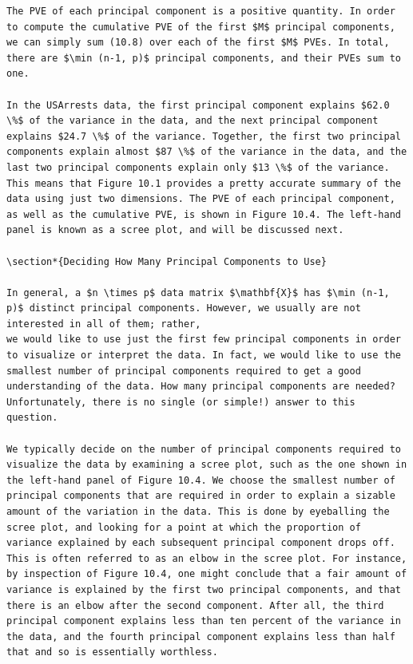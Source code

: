 \documentclass[10pt]{article}
\begin{document}
\begin{verbatim}
The PVE of each principal component is a positive quantity. In order to compute the cumulative PVE of the first $M$ principal components, we can simply sum (10.8) over each of the first $M$ PVEs. In total, there are $\min (n-1, p)$ principal components, and their PVEs sum to one.

In the USArrests data, the first principal component explains $62.0 \%$ of the variance in the data, and the next principal component explains $24.7 \%$ of the variance. Together, the first two principal components explain almost $87 \%$ of the variance in the data, and the last two principal components explain only $13 \%$ of the variance. This means that Figure 10.1 provides a pretty accurate summary of the data using just two dimensions. The PVE of each principal component, as well as the cumulative PVE, is shown in Figure 10.4. The left-hand panel is known as a scree plot, and will be discussed next.

\section*{Deciding How Many Principal Components to Use}

In general, a $n \times p$ data matrix $\mathbf{X}$ has $\min (n-1, p)$ distinct principal components. However, we usually are not interested in all of them; rather,
we would like to use just the first few principal components in order to visualize or interpret the data. In fact, we would like to use the smallest number of principal components required to get a good understanding of the data. How many principal components are needed? Unfortunately, there is no single (or simple!) answer to this question.

We typically decide on the number of principal components required to visualize the data by examining a scree plot, such as the one shown in the left-hand panel of Figure 10.4. We choose the smallest number of principal components that are required in order to explain a sizable amount of the variation in the data. This is done by eyeballing the scree plot, and looking for a point at which the proportion of variance explained by each subsequent principal component drops off. This is often referred to as an elbow in the scree plot. For instance, by inspection of Figure 10.4, one might conclude that a fair amount of variance is explained by the first two principal components, and that there is an elbow after the second component. After all, the third principal component explains less than ten percent of the variance in the data, and the fourth principal component explains less than half that and so is essentially worthless.


\end{verbatim}
\end{document}
